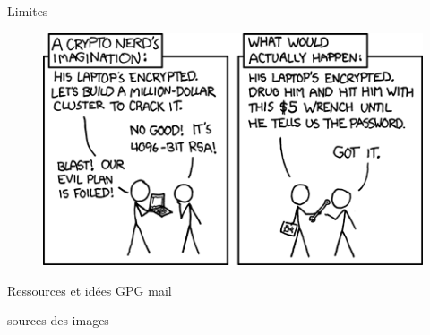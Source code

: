 \documentclass{beamer}
\begin{document}
\begin{frame}{Limites}
  \begin{figure}
    \centering
    \includegraphics[scale = 0.5]{xkcdsecurity.png}
  \end{figure}
\end{frame}

\begin{frame}{Ressources et idées}
  GPG mail
  
  sources des images
  \end{frame}
\end{document}
